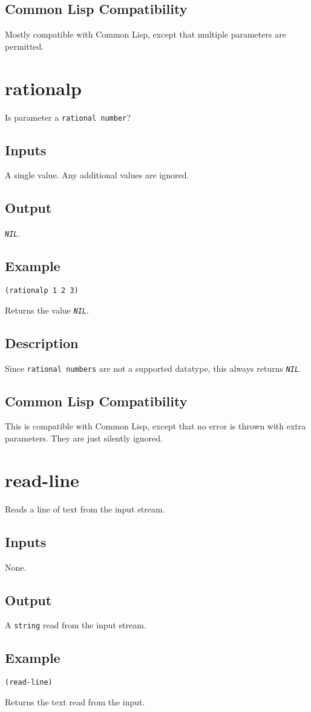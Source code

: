 \documentclass[10pt, openany]{book}
\newcommand{\constant}[1]{\emph{\texttt{#1}}}
\newcommand{\datatype}[1]{\texttt{#1}}
\newcommand{\cl}{Common Lisp}
\begin{document}
\subsection{Common Lisp Compatibility}
Mostly compatible with \cl, except that multiple parameters are permitted.

\section{rationalp}
Is parameter a \datatype{rational number}?
\subsection{Inputs}
A single value.  Any additional values are ignored.
\subsection{Output}
\constant{NIL}.
\subsection{Example}
\begin{lstlisting}
(rationalp 1 2 3)
\end{lstlisting}
Returns the value \constant{NIL}.
\subsection{Description}
Since \datatype{rational numbers} are not a supported datatype, this always returns \constant{NIL}.
\subsection{Common Lisp Compatibility}
This is compatible with \cl, except that no error is thrown with extra parameters.  They are just silently ignored.

\section{read-line}
Reads a line of text from the input stream.
\subsection{Inputs}
None.
\subsection{Output}
A \datatype{string} read from the input stream.
\subsection{Example}
\begin{lstlisting}
(read-line)
\end{lstlisting}
Returns the text read from the input.
\end{document}
